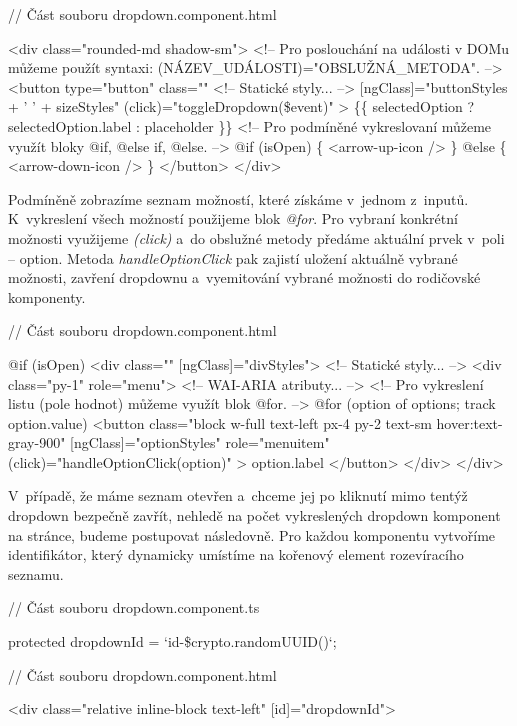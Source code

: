 \begin{prog}
// Část souboru dropdown.component.html

<div class="rounded-md shadow-sm">
  <!-- Pro poslouchání na události v DOMu můžeme 
    použít syntaxi: (NÁZEV_UDÁLOSTI)="OBSLUŽNÁ_METODA". -->
  <button
    type="button"
    class="" <!-- Statické styly... -->
    [ngClass]="buttonStyles + ' ' + sizeStyles"
    (click)="toggleDropdown(\$event)"
  >
    \{\{ selectedOption ? selectedOption.label : placeholder \}\}
    <!-- Pro podmíněné vykreslovaní můžeme využít bloky @if, @else if, @else. -->
    @if (isOpen) \{
      <arrow-up-icon />
    \} @else \{
      <arrow-down-icon />
    \}
  </button>
</div>
\end{prog}

Podmíněně zobrazíme seznam možností, které získáme v~jednom z~inputů. K~vykreslení všech možností použijeme blok \emph{@for}. 
Pro vybraní konkrétní možnosti využijeme \emph{(click)} a~do obslužné metody předáme aktuální prvek v~poli -- option. 
Metoda \emph{handleOptionClick} pak zajistí uložení aktuálně vybrané možnosti, zavření dropdownu a~vyemitování vybrané možnosti do rodičovské komponenty.

\begin{prog}
// Část souboru dropdown.component.html

@if (isOpen) {
  <div class="" [ngClass]="divStyles"> <!-- Statické styly... -->
    <div class="py-1" role="menu"> <!-- WAI-ARIA atributy... -->
      <!-- Pro vykreslení listu (pole hodnot) můžeme využít blok @for. -->
      @for (option of options; track option.value) {
        <button
          class="block w-full text-left px-4 py-2 text-sm hover:text-gray-900"
          [ngClass]="optionStyles"
          role="menuitem"
          (click)="handleOptionClick(option)"
        >
          {{ option.label }}
        </button>
      }
    </div>
  </div>
}
\end{prog}

V~případě, že máme seznam otevřen a~chceme jej po kliknutí mimo tentýž dropdown bezpečně zavřít, nehledě na počet vykreslených dropdown komponent na stránce, budeme postupovat následovně. 
Pro každou komponentu vytvoříme identifikátor, který dynamicky umístíme na kořenový element rozevíracího seznamu.

\begin{prog}
// Část souboru dropdown.component.ts

protected dropdownId = `id-\${crypto.randomUUID()}`;

// Část souboru dropdown.component.html

<div class="relative inline-block text-left" [id]="dropdownId">
\end{prog}

